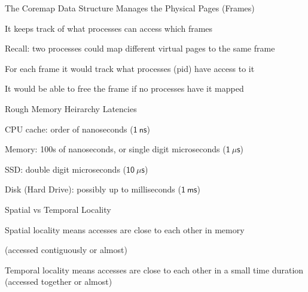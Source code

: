   \begin{frame}{The Coremap Data Structure Manages the Physical Pages (Frames)}

    It keeps track of what processes can access which frames

    \hspace{2em} Recall: two processes could map different virtual pages to the
                 same frame

    \vspace{2em}

    For each frame it would track what processes (pid) have access to it

    \vspace{2em}

    It would be able to free the frame if no processes have it mapped
  \end{frame}

  \begin{frame}{Rough Memory Heirarchy Latencies}

    CPU cache: order of nanoseconds ($\mathsf{1\ ns}$)

    \vspace{2em}

    Memory: 100s of nanoseconds, or single digit microseconds
            ($\mathsf{1\ \mu s}$)

    \vspace{2em}

    SSD: double digit microseconds ($\mathsf{10\ \mu s}$)

    \vspace{2em}

    Disk (Hard Drive): possibly up to milliseconds ($\mathsf{1\ ms}$)
  \end{frame}

  \begin{frame}{Spatial vs Temporal Locality}

    Spatial locality means accesses are close to each other in memory

    (accessed contiguously or almost)

    \vspace{2em}

    Temporal locality means accesses are close to each other in a small time
    duration (accessed together or almost)
  \end{frame}
  
